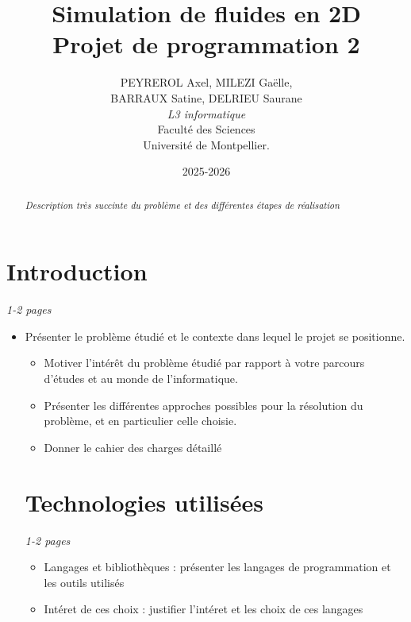 \documentclass[a4paper]{article}
\title{  Simulation de fluides en 2D\\         %
  Projet de programmation 2}
\author{ PEYREROL Axel, MILEZI Gaëlle,\\ BARRAUX Satine,  DELRIEU Saurane\\
  \emph{L3 informatique}\\
  Faculté des Sciences\\
Université de Montpellier.}
\date{2025-2026}
\begin{document}
\maketitle                    %


\begin{abstract}     %

  \emph{Description très succinte du problème et des différentes étapes de réalisation}

\end{abstract}
\newpage
\tableofcontents
\newpage
\section*{Introduction} %
\emph{1-2 pages}
\begin{itemize}%
\item Présenter le problème étudié et le contexte dans lequel le projet se positionne.
\begin{itemize}
    \item Motiver l'intérêt du problème étudié par rapport à votre parcours d'études et au monde de l'informatique.
    \item	Présenter les différentes approches possibles pour la résolution du problème, et en particulier celle choisie.
    \item Donner le cahier des charges détaillé
\end{itemize}

\section{Technologies utilisées}
\emph{1-2 pages}
\begin{itemize}
\item Langages et bibliothèques : présenter les langages de programmation et les outils utilisés
\item Intéret de ces choix : justifier l'intéret et les choix de ces langages 
\end{itemize}

\end{itemize}
\end{document}
